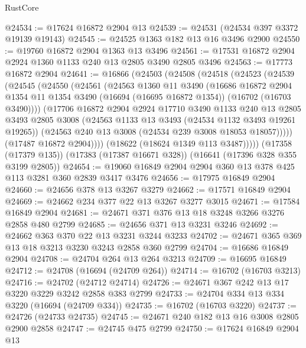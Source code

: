 \begin{lexlean}{RustCore}
\begin{coremodule}
@24534 := @17624 @16872 @2904 @13
@24539 := @24531 (@24534 @397 @3372 @19139 @19143)
@24545 := @24525 @1363 @182 @13 @16 @3496 @2900
@24550 := @19760 @16872 @2904 @1363 @13 @3496
@24561 := @17531 @16872 @2904 @2924 @1360 @1133 @240 @13 @2805 @3490 @2805 @3496
@24563 := @17773 @16872 @2904
@24641 := @16866
    (@24503
      (@24508
        (@24518
          (@24523
            (@24539
              (@24545
                (@24550
                  (@24561
                    (@24563
                      @1360
                      @11
                      @3490
                      (@16686
                        @16872
                        @2904
                        @1354
                        @11
                        @1354
                        @3490
                        (@16694 (@16695 @16872 @1354))
                        (@16702 (@16703 @3490))))
                    (@17706
                      @16872
                      @2904
                      @2924
                      @17710
                      @3490
                      @1133
                      @240
                      @13
                      @2805
                      @3493
                      @2805
                      @3008
                      (@24563 @1133 @13 @3493 (@24534 @1132 @3493 @19261 @19265))
                      (@24563 @240 @13 @3008 (@24534 @239 @3008 @18053 @18057)))))
                (@17487 @16872 @2904))))
          (@18622 (@18624 @1349 @113 @3487)))))
    (@17358 (@17379 @135))
    (@17383 (@17387 @16671 @328))
    (@16641 (@17396 @328 @355 @3199 @2805))
@24654 := @19060 @16849 @2904 @2904 @360 @13 @378 @425 @113 @3281 @360 @2839 @3417 @3476
@24656 := @17975 @16849 @2904
@24660 := @24656 @378 @13 @3267 @3279
@24662 := @17571 @16849 @2904
@24669 := @24662 @234 @377 @22 @13 @3267 @3277 @3015
@24671 := @17584 @16849 @2904
@24681 := @24671 @371 @376 @13 @18 @3248 @3266 @3276 @2858 @480 @2799
@24685 := @24656 @371 @13 @3231 @3246
@24692 := @24662 @363 @370 @22 @13 @3231 @3244 @3233
@24702 := @24671 @365 @369 @13 @18 @3213 @3230 @3243 @2858 @360 @2799
@24704 := @16686 @16849 @2904
@24708 := @24704 @264 @13 @264 @3213
@24709 := @16695 @16849
@24712 := @24708 (@16694 (@24709 @264))
@24714 := @16702 (@16703 @3213)
@24716 := @24702 (@24712 @24714)
@24726 := @24671 @367 @242 @13 @17 @3220 @3229 @3242 @2858 @383 @2799
@24733 := @24704 @334 @13 @334 @3220 (@16694 (@24709 @334))
@24735 := @16702 (@16703 @3220)
@24737 := @24726 (@24733 @24735)
@24745 := @24671 @240 @182 @13 @16 @3008 @2805 @2900 @2858
@24747 := @24745 @475 @2799
@24750 := @17624 @16849 @2904 @13

\end{coremodule}
\end{lexlean}
